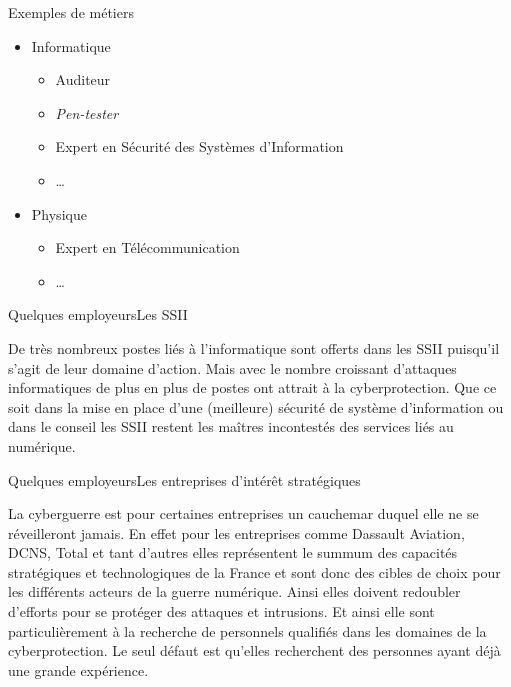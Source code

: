 \documentclass{beamer}
\begin{document}
\begin{frame}{Exemples de métiers}
    
    \begin{itemize}
        \item Informatique \begin{itemize}
            \item Auditeur
            \item \emph{Pen-tester}
            \item Expert en Sécurité des Systèmes d'Information
            \item \dots
        \end{itemize}
        \item Physique \begin{itemize}
            \item Expert en Télécommunication
            \item \dots
        \end{itemize}
    \end{itemize}
    
\end{frame}

\begin{frame}{Quelques employeurs}{Les SSII}

De très nombreux postes liés à l'informatique sont offerts dans les SSII puisqu'il s'agit de leur domaine d'action. Mais avec le nombre croissant d'attaques informatiques de plus en plus de postes ont attrait à la cyberprotection. Que ce soit dans la mise en place d'une (meilleure) sécurité de système d'information ou dans le conseil les SSII restent les maîtres incontestés des services liés au numérique.
    
\end{frame}

\begin{frame}{Quelques employeurs}{Les entreprises d'intérêt stratégiques}

La cyberguerre est pour certaines entreprises un cauchemar duquel elle ne se réveilleront jamais. En effet pour les entreprises comme Dassault Aviation, DCNS, Total et tant d'autres elles représentent le summum des capacités stratégiques et technologiques de la France et sont donc des cibles de choix pour les différents acteurs de la guerre numérique. Ainsi elles doivent redoubler d'efforts pour se protéger des attaques et intrusions. Et ainsi elle sont particulièrement à la recherche de personnels qualifiés dans les domaines de la cyberprotection. Le seul défaut est qu'elles recherchent des personnes ayant déjà une grande expérience.
    
\end{frame}
\end{document}
